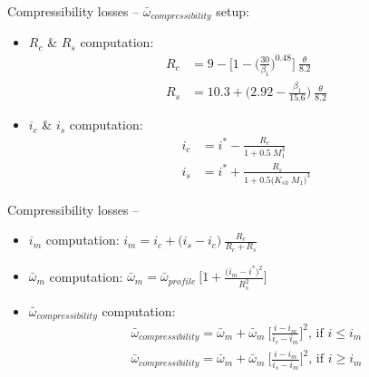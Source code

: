 	\begin{frame}{Compressibility losses -- }
		$\bar{\omega}_{compressibility}$ setup:
		\begin{itemize}
			\item $R_c$ \& $R_s$ computation:
				\begin{align}
					R_c & = 9 - \Bigg[1 - \Bigg( \frac{30}{\beta_1} \Bigg)^{0.48} \Bigg] \ \frac{\theta}{8.2} \nonumber \\
					R_s & = 10.3 + \Bigg( 2.92 - \frac{\beta_1}{15.6} \Bigg) \ \frac{\theta}{8.2} \nonumber  
				\end{align}
			\item $i_c$ \& $i_s$ computation:
				\begin{align}
					i_c & = i^{*} - \frac{R_c}{1 + 0.5 \ M_{1}^{3}} \nonumber \\
					i_s & = i^{*} + \frac{R_s}{1 + 0.5 \Big( K_{sh} \ M_{1} \Big)^3} \nonumber 
				\end{align}
		\end{itemize}
	\end{frame}

	\begin{frame}{Compressibility losses -- }
		\begin{itemize}
			\item $i_m$ computation: $i_m = i_c + \Big( i_s - i_c \Big) \ \frac{R_c}{R_c + R_s}$
			\item $\bar{\omega}_{m}$ computation: $\bar{\omega}_{m} = \bar{\omega}_{profile} \ \Bigg[ 1 + \frac{\big( i_m - i^{*} \big)^2}{R_s^{2}} \Bigg]$
			\item $\bar{\omega}_{compressibility}$ computation: 
				\begin{align}
					\bar{\omega}_{compressibility} = \bar{\omega}_m + \bar{\omega}_m \ \Bigg[ \frac{i - i_m}{i_c - i_m} \Bigg]^2 \text{, if } i \leq i_m\nonumber \\ 
					\bar{\omega}_{compressibility} = \bar{\omega}_m + \bar{\omega}_m \ \Bigg[ \frac{i - i_m}{i_s - i_m} \Bigg]^2 \text{, if } i \geq i_m \nonumber 
				\end{align}
		\end{itemize}
	\end{frame}


